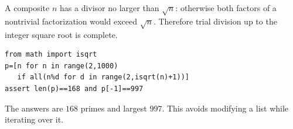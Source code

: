 A composite $n$ has a divisor no larger than $\sqrt n$: otherwise both factors of a nontrivial factorization would exceed $\sqrt n$. Therefore trial division up to the integer square root is complete.
\begin{verbatim}
from math import isqrt
p=[n for n in range(2,1000)
   if all(n%d for d in range(2,isqrt(n)+1))]
assert len(p)==168 and p[-1]==997
\end{verbatim}
The answers are $\boxed{168}$ primes and largest $\boxed{997}$. This avoids modifying a list while iterating over it.
